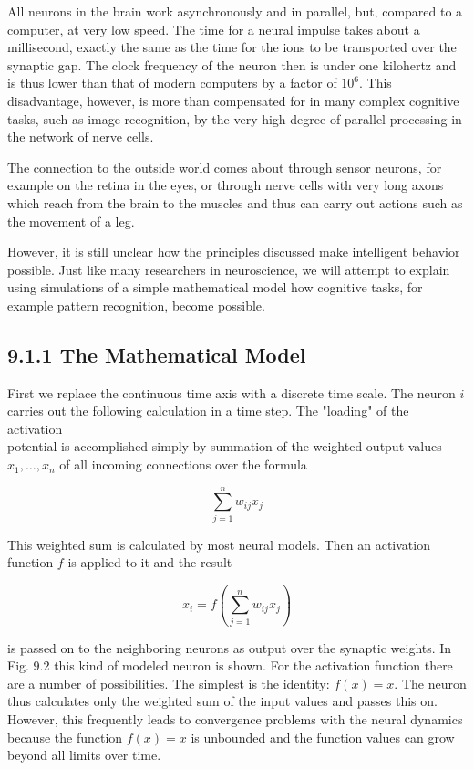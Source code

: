 \documentclass[10pt]{book}
\begin{document}
\begin{center}
\begin{enumerate}
\begin{center}
\begin{center}
\begin{center}
All neurons in the brain work asynchronously and in parallel, but, compared to a computer, at very low speed. The time for a neural impulse takes about a millisecond, exactly the same as the time for the ions to be transported over the synaptic gap. The clock frequency of the neuron then is under one kilohertz and is thus lower than that of modern computers by a factor of $10^{6}$. This disadvantage, however, is more than compensated for in many complex cognitive tasks, such as image recognition, by the very high degree of parallel processing in the network of nerve cells.

The connection to the outside world comes about through sensor neurons, for example on the retina in the eyes, or through nerve cells with very long axons which reach from the brain to the muscles and thus can carry out actions such as the movement of a leg.

However, it is still unclear how the principles discussed make intelligent behavior possible. Just like many researchers in neuroscience, we will attempt to explain using simulations of a simple mathematical model how cognitive tasks, for example pattern recognition, become possible.

\subsection*{9.1.1 The Mathematical Model}
First we replace the continuous time axis with a discrete time scale. The neuron $i$ carries out the following calculation in a time step. The "loading" of the activation\\
potential is accomplished simply by summation of the weighted output values $x_{1}, \ldots, x_{n}$ of all incoming connections over the formula


$$
\sum_{j=1}^{n} w_{i j} x_{j}
$$

This weighted sum is calculated by most neural models. Then an activation function $f$ is applied to it and the result

$$
x_{i}=f\left(\sum_{j=1}^{n} w_{i j} x_{j}\right)
$$

is passed on to the neighboring neurons as output over the synaptic weights. In Fig. 9.2 this kind of modeled neuron is shown. For the activation function there are a number of possibilities. The simplest is the identity: $f(x)=x$. The neuron thus calculates only the weighted sum of the input values and passes this on. However, this frequently leads to convergence problems with the neural dynamics because the function $f(x)=x$ is unbounded and the function values can grow beyond all limits over time.


\end{center}
\end{center}
\end{center}
\end{enumerate}
\end{center}
\end{document}

